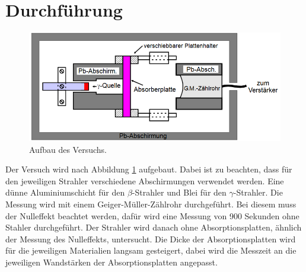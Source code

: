 \section{Durchführung}
\label{sec:Durchführung}
\begin{figure}[H]
    \centering
    \includegraphics[width=\textwidth]{content/Aufbau.png}
    \caption{Aufbau des Versuchs.\cite{v704}}
    \label{fig:mess}
\end{figure}
\noindent
Der Versuch wird nach Abbildung \ref{fig:mess} aufgebaut.
Dabei ist zu beachten, dass für  den jeweiligen Strahler verschiedene Abschirmungen verwendet werden.
Eine dünne Aluminiumschicht für den $\beta$-Strahler und Blei für den $\gamma$-Strahler.
Die Messung wird mit einem Geiger-Müller-Zählrohr durchgeführt.
Bei diesem muss der Nulleffekt beachtet werden, dafür wird eine Messung von 900 Sekunden ohne Stahler durchgeführt.
Der Strahler wird danach ohne Absorptionsplatten, ähnlich der Messung des Nulleffekts, untersucht.
Die Dicke der Absorptionsplatten wird für die jeweiligen Materialien langsam gesteigert, dabei wird die Messzeit an die jeweiligen Wandstärken der Absorptionsplatten angepasst.
